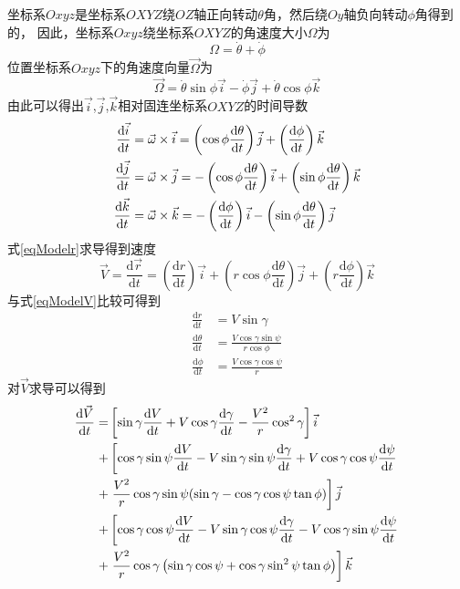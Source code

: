 坐标系$Oxyz$是坐标系$OXYZ$绕$OZ$轴正向转动$\theta$角，然后绕$Oy$轴负向转动$\phi$角得到的，
因此，坐标系$Oxyz$绕坐标系$OXYZ$的角速度大小$\Omega$为
\[\Omega = \dot{\theta} + \dot{\phi}\]
位置坐标系$Oxyz$下的角速度向量$\vec{\Omega}$为
\[\vec{\Omega} = \dot{\theta}\sin\phi\vec{i} - \dot{\phi}\vec{j} +\dot{\theta}\cos\phi\vec{k}\]
由此可以得出$\vec{i}$,$\vec{j}$,$\vec{k}$相对固连坐标系$OXYZ$的时间导数
\begin{align*}
    \frac{\text{\text{\text{\text{\text{d}}}}}\vec{i}}{\text{\text{\text{\text{\text{d}}}}}t} &=\vec{\omega} \times \vec{i}
    =  \left(\cos \phi \frac{\text{\text{\text{\text{\text{d}}}}}\theta}{\text{\text{\text{\text{\text{d}}}}}t}\right) \vec{j}
    + \left(\frac{\text{\text{\text{\text{\text{d}}}}}\phi}{\text{\text{\text{\text{\text{d}}}}}t}\right) \vec{k} \\
    \frac{\text{d}\vec{j}}{\text{d}t} &=\vec{\omega} \times \vec{j}
    = -\left(\cos \phi \frac{\text{d}\theta}{\text{d}t}\right) \vec{i}
    + \left(\sin \phi \frac{\text{d}\theta}{\text{d}t}\right) \vec{k} \\
    \frac{\text{d}\vec{k}}{\text{d}t} &=\vec{\omega} \times \vec{k}
    = -\left(\frac{\text{d}\phi}{\text{d}t}\right) \vec{i}
    - \left(\sin \phi \frac{\text{d}\theta}{\text{d}t}\right) \vec{j}
\end{align*}
式\eqref{eqModelr}求导得到速度
\[
    \vec{V}=\frac{\text{d}\vec{r}}{\text{d}t}
    =\left(\frac{\text{d}r}{\text{d}t}\right)\vec{i}
    +\left(r\cos\phi\frac{\text{d}\theta}{\text{d}t}\right)\vec{j}
    +\left(r\frac{\text{d}\phi}{\text{d}t}\right)\vec{k}
\]
与式\eqref{eqModelV}比较可得到
\begin{align*}
    \frac{\text{d}r}{\text{d}t} &=V\sin\gamma \\
    \frac{\text{d}\theta}{\text{d}t}&=\frac{V\cos\gamma\sin\psi}{r\cos\phi} \\
    \frac{\text{d}\phi}{\text{d}t}&=\frac{V\cos\gamma\cos\psi}{r}
\end{align*}
对$\vec{V}$求导可以得到
\begin{align}
    \frac{\text{d}\vec{V}}{\text{d}t}
    =& \left[\sin\gamma\frac{\text{d}V}{\text{d}t}
    + V\cos\gamma\frac{\text{d}\gamma}{\text{d}t}
    - \frac{V^{2}}{r}\cos^2\gamma\right]\vec{i} \notag\\
    +& \left[\cos\gamma\sin\psi\frac{\text{d}V}{\text{d}t}
    - V\sin\gamma\sin\psi\frac{\text{d}\gamma}{\text{d}t}
    + V\cos\gamma\cos\psi\frac{\text{d}\psi}{\text{d}t}\right. \notag\\
    +& \left.\frac{V^{2}}{r}\cos\gamma\sin\psi(\sin\gamma
    - \cos\gamma\cos\psi\tan\phi)\right]\vec{j} \notag\\
    +& \left[\cos\gamma\cos\psi\frac{\text{d}V}{\text{d}t}
    - V\sin\gamma\cos\psi\frac{\text{d}\gamma}{\text{d}t}
    - V\cos\gamma\sin\psi\frac{\text{d}\psi}{\text{d}t}\right. \notag\\
    +& \left.\frac{V^{2}}{r}\cos\gamma\left(\sin\gamma\cos\psi+\cos\gamma\sin^2\psi\tan\phi\right)\right]\vec{k} \label{eqModelTotal}
\end{align}

